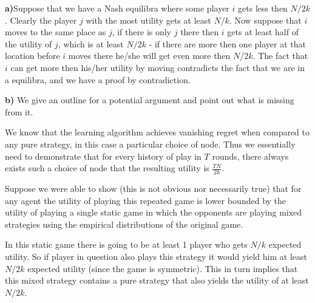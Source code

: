 \textbf{a)}Suppose that we have a Nash equilibra where some player $i$ gets less then $N/2k$. Clearly the player $j$ with the most utility gets at least $N/k$. Now suppose that $i$ moves to the same place as $j$, if there is only $j$ there then $i$ gets at least half of the utility of $j$, which is at least $N/2k$ - if there are more then one player at that location before $i$ moves there he/she will get even more then $N/2k$. The fact that $i$ can get more then his/her utility by moving contradicts the fact that we are in a equilibra, and we have a proof by contradiction. 


\textbf{b)} We give an outline for a potential argument and point out what is missing from it.

We know that the learning algorithm achieves vanishing regret when compared to any pure strategy, in this case a particular choice of node. Thus we essentially need to demonstrate that for every history of play in $T$ rounds, there always exists such a choice of node that the resulting utility is $\frac{TN}{2k}$.

Suppose we were able to show (this is not obvious nor necessarily true) that for any agent the utility of playing this repeated game is lower bounded by the utility of playing a single static game in which the opponents are playing mixed strategies using the empirical distributions of the original game. 

In this static game there is going to be at least 1 player who gets $N/k$ expected utility. So if player in question also plays this strategy it would yield him at least $N/2k$ expected utility (since the game is symmetric).  This in turn implies that this mixed strategy contains a pure strategy that also yields the utility of at least $N/2k$.